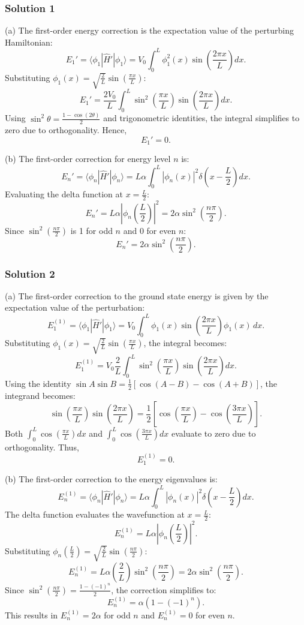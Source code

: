 \documentclass{article}
\begin{document}
\subsubsection{Solution 1}
(a) The first-order energy correction is the expectation value of the perturbing Hamiltonian:
\[
E_1' = \langle \phi_1 | \hat{H}' | \phi_1 \rangle = V_0 \int_0^L \phi_1^2(x) \sin\left(\frac{2\pi x}{L}\right) dx.
\]
Substituting \(\phi_1(x) = \sqrt{\frac{2}{L}} \sin\left(\frac{\pi x}{L}\right)\):
\[
E_1' = \frac{2V_0}{L} \int_0^L \sin^2\left(\frac{\pi x}{L}\right) \sin\left(\frac{2\pi x}{L}\right) dx.
\]
Using \(\sin^2\theta = \frac{1 - \cos(2\theta)}{2}\) and trigonometric identities, the integral simplifies to zero due to orthogonality. Hence,
\[
\boxed{E_1' = 0}.
\]

(b) The first-order correction for energy level \(n\) is:
\[
E_n' = \langle \phi_n | \hat{H}' | \phi_n \rangle = L\alpha \int_0^L |\phi_n(x)|^2 \delta\left(x - \frac{L}{2}\right) dx.
\]
Evaluating the delta function at \(x = \frac{L}{2}\):
\[
E_n' = L\alpha \left|\phi_n\left(\frac{L}{2}\right)\right|^2 = 2\alpha \sin^2\left(\frac{n\pi}{2}\right).
\]
Since \(\sin^2\left(\frac{n\pi}{2}\right)\) is 1 for odd \(n\) and 0 for even \(n\):
\[
\boxed{E_n' = 2\alpha \sin^2\left(\frac{n\pi}{2}\right)}.
\]

\subsubsection{Solution 2}
(a) The first-order correction to the ground state energy is given by the expectation value of the perturbation:
\[
E_1^{(1)} = \langle \phi_1 | \hat{H}' | \phi_1 \rangle = V_0 \int_0^L \phi_1(x) \sin\left(\frac{2\pi x}{L}\right) \phi_1(x) \, dx.
\]
Substituting \(\phi_1(x) = \sqrt{\frac{2}{L}} \sin\left(\frac{\pi x}{L}\right)\), the integral becomes:
\[
E_1^{(1)} = V_0 \frac{2}{L} \int_0^L \sin^2\left(\frac{\pi x}{L}\right) \sin\left(\frac{2\pi x}{L}\right) dx.
\]
Using the identity \(\sin A \sin B = \frac{1}{2}[\cos(A-B) - \cos(A+B)]\), the integrand becomes:
\[
\sin\left(\frac{\pi x}{L}\right) \sin\left(\frac{2\pi x}{L}\right) = \frac{1}{2}\left[\cos\left(\frac{\pi x}{L}\right) - \cos\left(\frac{3\pi x}{L}\right)\right].
\]
Both \(\int_0^L \cos\left(\frac{\pi x}{L}\right) dx\) and \(\int_0^L \cos\left(\frac{3\pi x}{L}\right) dx\) evaluate to zero due to orthogonality. Thus,
\[
E_1^{(1)} = 0.
\]

(b) The first-order correction to the energy eigenvalues is:
\[
E_n^{(1)} = \langle \phi_n | \hat{H}' | \phi_n \rangle = L \alpha \int_0^L |\phi_n(x)|^2 \delta\left(x - \frac{L}{2}\right) dx.
\]
The delta function evaluates the wavefunction at \(x = \frac{L}{2}\):
\[
E_n^{(1)} = L \alpha \left|\phi_n\left(\frac{L}{2}\right)\right|^2.
\]
Substituting \(\phi_n\left(\frac{L}{2}\right) = \sqrt{\frac{2}{L}} \sin\left(\frac{n\pi}{2}\right)\):
\[
E_n^{(1)} = L \alpha \left(\frac{2}{L}\right) \sin^2\left(\frac{n\pi}{2}\right) = 2\alpha \sin^2\left(\frac{n\pi}{2}\right).
\]
Since \(\sin^2\left(\frac{n\pi}{2}\right) = \frac{1 - (-1)^n}{2}\), the correction simplifies to:
\[
E_n^{(1)} = \alpha \left(1 - (-1)^n\right).
\]
This results in \(E_n^{(1)} = 2\alpha\) for odd \(n\) and \(E_n^{(1)} = 0\) for even \(n\).
\end{document}
